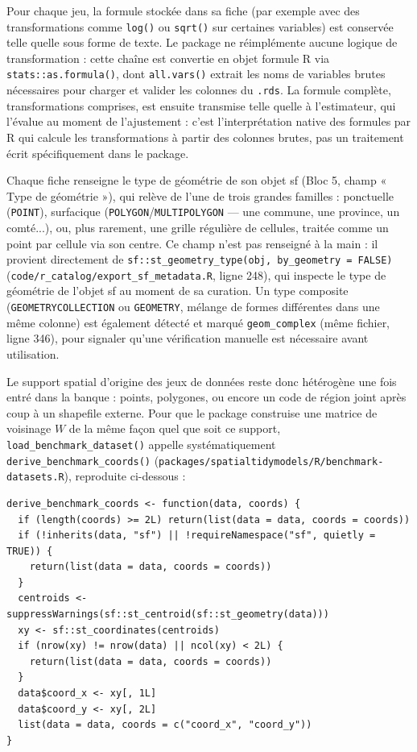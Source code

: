 \documentclass[11pt,a4paper]{article}
\begin{document}
Pour chaque jeu, la formule stockée dans sa fiche (par exemple avec des transformations comme \texttt{log()} ou \texttt{sqrt()} sur certaines variables) est conservée telle quelle sous forme de texte. Le package ne réimplémente aucune logique de transformation : cette chaîne est convertie en objet formule R via \texttt{stats::as.formula()}, dont \texttt{all.vars()} extrait les noms de variables brutes nécessaires pour charger et valider les colonnes du \texttt{.rds}. La formule complète, transformations comprises, est ensuite transmise telle quelle à l'estimateur, qui l'évalue au moment de l'ajustement : c'est l'interprétation native des formules par R qui calcule les transformations à partir des colonnes brutes, pas un traitement écrit spécifiquement dans le package.

Chaque fiche renseigne le type de géométrie de son objet sf (Bloc 5, champ « Type de géométrie »), qui relève de l'une de trois grandes familles : ponctuelle (\texttt{POINT}), surfacique (\texttt{POLYGON}/\texttt{MULTIPOLYGON} — une commune, une province, un comté...), ou, plus rarement, une grille régulière de cellules, traitée comme un point par cellule via son centre. Ce champ n'est pas renseigné à la main : il provient directement de \texttt{sf::st\_geometry\_type(obj, by\_geometry = FALSE)} (\texttt{code/r\_catalog/export\_sf\_metadata.R}, ligne 248), qui inspecte le type de géométrie de l'objet sf au moment de sa curation. Un type composite (\texttt{GEOMETRYCOLLECTION} ou \texttt{GEOMETRY}, mélange de formes différentes dans une même colonne) est également détecté et marqué \texttt{geom\_complex} (même fichier, ligne 346), pour signaler qu'une vérification manuelle est nécessaire avant utilisation.

Le support spatial d'origine des jeux de données reste donc hétérogène une fois entré dans la banque : points, polygones, ou encore un code de région joint après coup à un shapefile externe. Pour que le package construise une matrice de voisinage $W$ de la même façon quel que soit ce support, \texttt{load\_benchmark\_dataset()} appelle systématiquement \texttt{derive\_benchmark\_coords()} (\texttt{packages/spatialtidymodels/R/benchmark-datasets.R}), reproduite ci-dessous :

{\footnotesize
\begin{verbatim}
derive_benchmark_coords <- function(data, coords) {
  if (length(coords) >= 2L) return(list(data = data, coords = coords))
  if (!inherits(data, "sf") || !requireNamespace("sf", quietly = TRUE)) {
    return(list(data = data, coords = coords))
  }
  centroids <- suppressWarnings(sf::st_centroid(sf::st_geometry(data)))
  xy <- sf::st_coordinates(centroids)
  if (nrow(xy) != nrow(data) || ncol(xy) < 2L) {
    return(list(data = data, coords = coords))
  }
  data$coord_x <- xy[, 1L]
  data$coord_y <- xy[, 2L]
  list(data = data, coords = c("coord_x", "coord_y"))
}
\end{verbatim}
}
\end{document}
